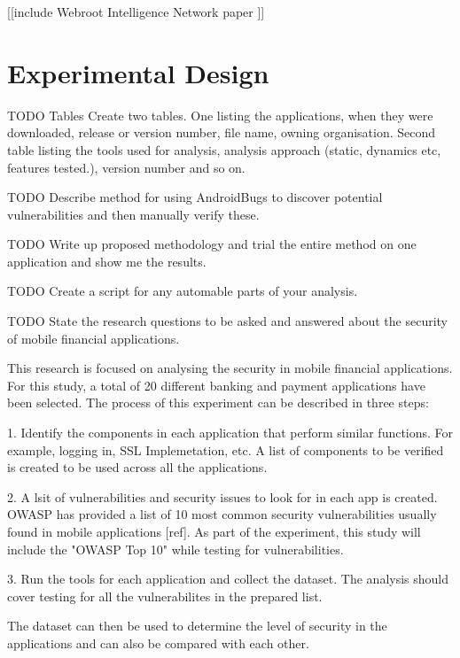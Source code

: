 \documentclass{mproj}
\begin{document}
[[include Webroot Intelligence Network paper \cite{webroot}]]



\chapter{Experimental Design}

TODO Tables Create two tables.  One listing the applications, when they were downloaded, release or version number, file
name, owning organisation.  Second table listing the tools used for analysis, analysis approach (static, dynamics etc,
features tested.), version number and so on.

TODO Describe method for using AndroidBugs to discover potential vulnerabilities and then manually verify these.

TODO Write up proposed methodology and trial the entire method on one application and show me the results.

TODO Create a script for any automable parts of your analysis. 

TODO State the research questions to be asked and answered about the security of mobile financial applications.



This research is focused on analysing the security in mobile financial applications. For this study, a total of 20 different banking and payment applications have been selected.  
The process of this experiment can be described in three steps:

1. Identify the components in each application that perform similar functions. For example, logging in, SSL Implemetation, etc. A list of components to be verified is created to be used across all the applications.

2. A lsit of vulnerabilities and security issues to look for in each app is created. OWASP has provided a list of 10 most common security vulnerabilities usually found in mobile applications [ref]. As part of the experiment, this study will include the "OWASP Top 10" while testing for vulnerabilities.

3. Run the tools for each application and collect the dataset. The analysis should cover testing for all the vulnerabilites in the prepared list.

The dataset can then be used to determine the level of security in the applications and can also be compared with each other.
\end{document}
